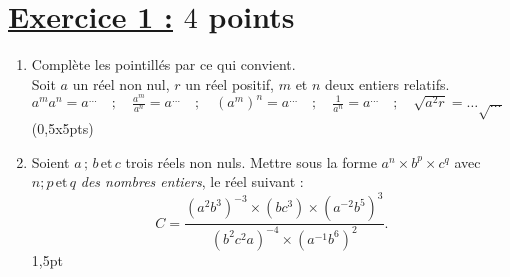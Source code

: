 \documentclass[12pt,a4paper]{article}
\begin{document}
\renewcommand{\arraystretch}{1.5}
\renewcommand{\arrayrulewidth}{1.2pt}
\vspace{3cm}

\section*{\underline{Exercice 1 :} $4$ points}

\begin{enumerate}
    \item Complète les pointillés par ce qui convient. \\
    Soit \( a \) un réel non nul, \( r \) un réel positif, \( m \) et \( n \) deux entiers relatifs. \\[2mm]
    \(
    a^m a^n = a^{\dots} \quad ; \quad \frac{a^m}{a^n} = a^{\dots} \quad ; \quad (a^m)^n = a^{\dots} \quad ; \quad \frac{1}{a^n} = a^{\dots} \quad ; \quad \sqrt{a^2 r} = \dots \sqrt{\dots}
    \) \hfill (0,5x5pts)

    \item Soient \( a \, ; \, b \, \text{et} \, c \) trois réels non nuls. Mettre sous la forme \( a^n \times b^p \times c^q \) avec \\ 
    \( n; p \, \text{et} \, q \) \textit{des nombres entiers}, le réel suivant :\\[2mm]
    \[
    C = \frac{(a^2 b^3)^{-3} \times (bc^3) \times (a^{-2} b^5)^3}{(b^2 c^2a)^{-4} \times (a^{-1} b^6)^2}.
    \]
    \hfill 1,5pt
\end{enumerate}
\end{document}
